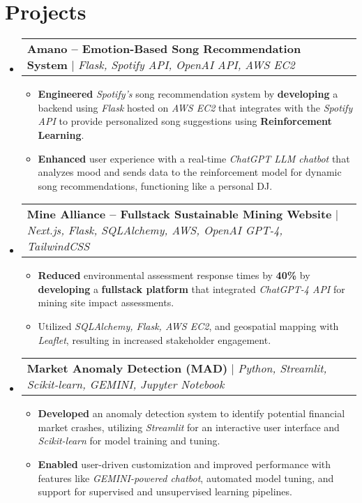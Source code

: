 \documentclass[letterpaper,10pt]{article}
\makeatletter
\newcommand{\resumeItem}[1]{
  \item\small{
    {#1 \vspace{-2pt}}
  }
}
\newcommand{\resumeProjectHeading}[2]{
    \item
    \begin{tabular*}{0.97\textwidth}{l@{\extracolsep{\fill}}r}
      \small#1 & #2 \\
    \end{tabular*}\vspace{-2pt}
}
\newcommand{\resumeSubHeadingListStart}{\begin{itemize}[leftmargin=0.15in, label={}]}
\newcommand{\resumeSubHeadingListEnd}{\end{itemize}}
\newcommand{\resumeItemListStart}{\begin{itemize}}
\newcommand{\resumeItemListEnd}{\end{itemize}\vspace{-5pt}}
\makeatother
\begin{document}
\section{Projects}
    \vspace{-4pt}
    \resumeSubHeadingListStart
      \resumeProjectHeading
          {\textbf{Amano – Emotion-Based Song Recommendation System} $|$ \emph{Flask, Spotify API, OpenAI API, AWS EC2}}{}
      \vspace{-4pt} %
          \resumeItemListStart
            \resumeItem{\textbf{Engineered} \emph{Spotify's} song recommendation system by \textbf{developing} a backend using \emph{Flask} hosted on \emph{AWS EC2} that integrates with the \emph{Spotify API} to provide personalized song suggestions using \textbf{Reinforcement Learning}.}
            \resumeItem{\textbf{Enhanced} user experience with a real-time \emph{ChatGPT LLM chatbot} that analyzes mood and sends data to the reinforcement model for dynamic song recommendations, functioning like a personal DJ.}
          \resumeItemListEnd

      \resumeProjectHeading
          {\textbf{Mine Alliance – Fullstack Sustainable Mining Website} $|$ \emph{Next.js, Flask, SQLAlchemy, AWS, OpenAI GPT-4, TailwindCSS}}{}
      \vspace{-4pt}
          \resumeItemListStart
            \resumeItem{\textbf{Reduced} environmental assessment response times by \textbf{40\%} by \textbf{developing} a \textbf{fullstack platform} that integrated \emph{ChatGPT-4 API} for mining site impact assessments.}
            \resumeItem{Utilized \emph{SQLAlchemy, Flask, AWS EC2}, and geospatial mapping with \emph{Leaflet}, resulting in increased stakeholder engagement.}
          \resumeItemListEnd

      \resumeProjectHeading
          {\textbf{Market Anomaly Detection (MAD)} $|$ \emph{Python, Streamlit, Scikit-learn, GEMINI, Jupyter Notebook}}{}
      \vspace{-4pt}
          \resumeItemListStart
            \resumeItem{\textbf{Developed} an anomaly detection system to identify potential financial market crashes, utilizing \emph{Streamlit} for an interactive user interface and \emph{Scikit-learn} for model training and tuning.}
            \resumeItem{\textbf{Enabled} user-driven customization and improved performance with features like \emph{GEMINI-powered chatbot}, automated model tuning, and support for supervised and unsupervised learning pipelines.}
          \resumeItemListEnd
    \resumeSubHeadingListEnd
\end{document}
